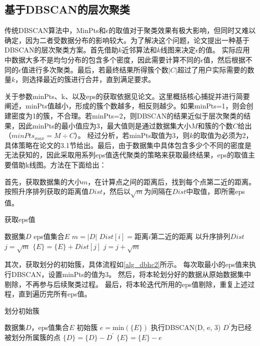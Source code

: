 \subsection{基于DBSCAN的层次聚类}
传统DBSCAN算法中，MinPts和$ \epsilon $的取值对于聚类效果有极大影响，但同时又难以确定，因为二者受数据分布的影响较大。为了解决这个问题，论文\cite{latifi2021dbhc}提出一种基于DBSCAN的层次聚类方案。首先借助$ k $近邻算法和$ k $线图来决定$ \epsilon $的值。
实际应用中数据大多不是均匀分布的包含多个密度，因此需要计算不同的$ \epsilon $值，然后根据不同的$ \epsilon $值进行多次聚类。最后，若最终结果所得簇个数$ |C| $超过了用户实际需要的数量$ k $，则选择最近的簇进行合并，直到满足要求。

关于参数minPts、k、以及eps的获取依据见论文\cite{latifi2021dbhc}。这里概括核心捕捉并进行简要阐述，minPts值越小，形成的簇个数越多，相反则越少。如果minPts=1，则会创建密度为1的簇，不合理。若minPts=2，则DBSCAN的结果近似于层次聚类的结果，因此minPts的最小值应为3，最大值则是通过数据集大小$ M $和簇的个数$ C $给出（$ minPts_{max} = M\div C $）。
经过分析，若minPts取值为3，则$ k $的取值为必须为2，具体策略在论文\cite{latifi2021dbhc}的3.1节给出。最后，由于数据集中具体包含多少个不同的密度是无法获知的，因此采取用系列eps值迭代聚类的策略来获取最终结果，eps的取值主要借助k线图。方法在下面给出：

首先，获取数据集的大小$ m $，在计算点之间的距离后，找到每个点第二近的距离。按照升序排列获取的距离值$ Dist $，然后以$ \sqrt{m} $为间隔在$ Dist $中取值，即所需eps值。
\begin{algorithm}[htbp]
	\renewcommand{\algorithmicrequire}{\textbf{输入:}}
	\renewcommand{\algorithmicensure}{\textbf{输出:}}
	\caption{获取eps值}
	\label{alg_dbhc1}
	\begin{algorithmic}[1]
		\REQUIRE 数据集$ D $
		\ENSURE eps值集合$ E $
		\STATE $ m = |D| $
		\STATE $ Dist[i] =$距离$i$第二近的距离
		\ENDFOR
		\STATE 以升序排列$ Dist $
		\STATE $ j = \sqrt{m} $
		\STATE $ \{E\} = \{E\} + Dist[j] $
		\STATE $ j = j + \sqrt{m} $
		\ENDWHILE
	\end{algorithmic}
\end{algorithm}

其次，获取划分的初始簇，具体流程如\ref{alg_dbhc2}所示。
每次取最小的eps值来执行DBSCAN，设置minPts的值为3。
然后，将本轮划分好的数据从原始数据集中剔除，不再参与后续聚类过程。
最后，将本轮迭代所用的eps值剔除，重复上述过程，直到遍历完所有eps值。
\begin{algorithm}[htbp]
	\renewcommand{\algorithmicrequire}{\textbf{输入:}}
	\renewcommand{\algorithmicensure}{\textbf{输出:}}
	\caption{划分初始簇}
	\label{alg_dbhc2}
	\begin{algorithmic}[1]
		\REQUIRE 数据集$ D $，eps值集合$ E $
		\ENSURE 初始簇
		\STATE $ e = \text{min}(\{E\}) $
		\STATE 执行DBSCAN(D, e, 3)
		\STATE $ D^{\prime} $为已经被划分所属簇的点
		\STATE $ \{D\} = \{D\} - D^{\prime} $
		\STATE $ \{E\} = \{E\} - e $
		\ENDWHILE
	\end{algorithmic}
\end{algorithm}

